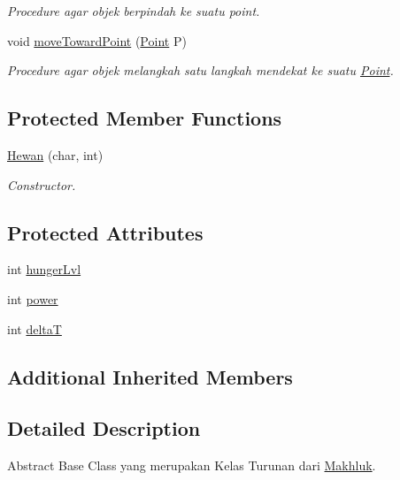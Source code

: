 \begin{DoxyCompactItemize}
\begin{DoxyCompactList}\small\item\em Procedure agar objek berpindah ke suatu point. \end{DoxyCompactList}\item 
void \hyperlink{class_hewan_a375987dfe4052f14a6edd19c9b59937a}{move\+Toward\+Point} (\hyperlink{class_point}{Point} P)
\begin{DoxyCompactList}\small\item\em Procedure agar objek melangkah satu langkah mendekat ke suatu \hyperlink{class_point}{Point}. \end{DoxyCompactList}\end{DoxyCompactItemize}
\subsection*{Protected Member Functions}
\begin{DoxyCompactItemize}
\item 
\hyperlink{class_hewan_a5ea6a7a559331a71c86c59eaeb3809db}{Hewan} (char, int)
\begin{DoxyCompactList}\small\item\em Constructor. \end{DoxyCompactList}\end{DoxyCompactItemize}
\subsection*{Protected Attributes}
\begin{DoxyCompactItemize}
\item 
int \hyperlink{class_hewan_ac2181643305f48f23c648b58d5b662b5}{hunger\+Lvl}
\item 
int \hyperlink{class_hewan_a3fbf8081066fe2fb2b7b8cce149910a1}{power}
\item 
int \hyperlink{class_hewan_a7d22294907eb5b03983fdb179b248c18}{deltaT}
\end{DoxyCompactItemize}
\subsection*{Additional Inherited Members}


\subsection{Detailed Description}
Abstract Base Class yang merupakan Kelas Turunan dari \hyperlink{class_makhluk}{Makhluk}. 

